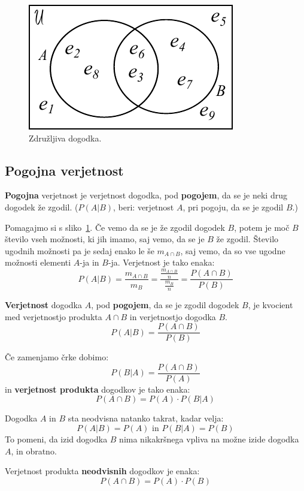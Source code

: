 \documentclass[a4paper,oneside,12pt,fleqn]{article}
\newcommand\krat\cdot
\newcommand{\beforecaptionskip}{\vspace{-12pt}}
\numberwithin{equation}{section}
\begin{document}
\begin{figure}[h]
  \begin{center}
    \includegraphics{slike/verjetnost_dogodki.pdf}
  \end{center}
  \beforecaptionskip
  \caption{Združljiva dogodka.}
  \label{fig:verj:zdruz}
\end{figure}

\subsection{Pogojna verjetnost}
\label{sec:verj:pog}

\textbf{Pogojna} verjetnost je verjetnost dogodka, pod \textbf{pogojem}, da se je neki drug dogodek že
zgodil. ($P(A|B)$, beri: verjetnost $A$, pri pogoju, da se je zgodil $B$.)

Pomagajmo si s sliko~\ref{fig:verj:zdruz}.
Če vemo da se je že zgodil dogodek $B$, potem je moč $B$ število vseh možnosti, ki jih
imamo, saj vemo, da se je $B$ že zgodil.
Število ugodnih možnosti pa je sedaj enako le še $m_{A\cap B}$, saj vemo, da so vse ugodne
možnosti elementi $A$-ja in $B$-ja. Verjetnost je tako enaka:
\[ P(A|B) = \frac{m_{A\cap B}}{m_B} = \frac{\frac{m_{A\cap B}}{n}}{\frac{m_B}{n}} =
\frac{P(A\cap B)}{P(B)} \]

\textbf{Verjetnost} dogodka $A$, pod \textbf{pogojem}, da se je zgodil dogodek $B$, je kvocient med
verjetnostjo produkta $A \cap B$ in verjetnostjo dogodka $B$.
\[ P(A|B) = \frac{P(A\cap B)}{P(B)} \]

Če zamenjamo črke dobimo:
\[ P(B|A) = \frac{P(A\cap B)}{P(A)} \]
in \textbf{verjetnost produkta} dogodkov je tako enaka:
\[ P(A\cap B) = P(A) \krat P(B|A) \]

Dogodka $A$ in $B$ sta neodvisna natanko takrat, kadar velja:
\[ P(A|B) = P(A) \text{ in } P(B|A) = P(B) \]
To pomeni, da izid dogodka $B$ nima nikakršnega vpliva na možne izide dogodka $A$, in
obratno.

Verjetnost produkta \textbf{neodvisnih} dogodkov je enaka:
\[ P(A \cap B) = P(A)\krat P(B) \]
\end{document}
